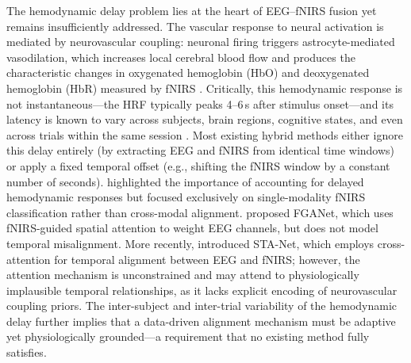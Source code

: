 \documentclass[preprint,12pt,authoryear]{elsarticle}
\begin{document}
The hemodynamic delay problem lies at the heart of EEG--fNIRS fusion yet remains insufficiently addressed. The vascular response to neural activation is mediated by neurovascular coupling: neuronal firing triggers astrocyte-mediated vasodilation, which increases local cerebral blood flow and produces the characteristic changes in oxygenated hemoglobin (HbO) and deoxygenated hemoglobin (HbR) measured by fNIRS \citep{buxton1998dynamics, scholkmann2014general}. Critically, this hemodynamic response is not instantaneous---the HRF typically peaks 4--6\,s after stimulus onset---and its latency is known to vary across subjects, brain regions, cognitive states, and even across trials within the same session \citep{lindquist2009modeling, das2022neural}. Most existing hybrid methods either ignore this delay entirely (by extracting EEG and fNIRS from identical time windows) or apply a fixed temporal offset (e.g., shifting the fNIRS window by a constant number of seconds). \citet{wang2023fnirs_rethink} highlighted the importance of accounting for delayed hemodynamic responses but focused exclusively on single-modality fNIRS classification rather than cross-modal alignment. \citet{kwak2022fganet} proposed FGANet, which uses fNIRS-guided spatial attention to weight EEG channels, but does not model temporal misalignment. More recently, \citet{liu2025sta} introduced STA-Net, which employs cross-attention for temporal alignment between EEG and fNIRS; however, the attention mechanism is unconstrained and may attend to physiologically implausible temporal relationships, as it lacks explicit encoding of neurovascular coupling priors. The inter-subject and inter-trial variability of the hemodynamic delay further implies that a data-driven alignment mechanism must be adaptive yet physiologically grounded---a requirement that no existing method fully satisfies.
\end{document}
